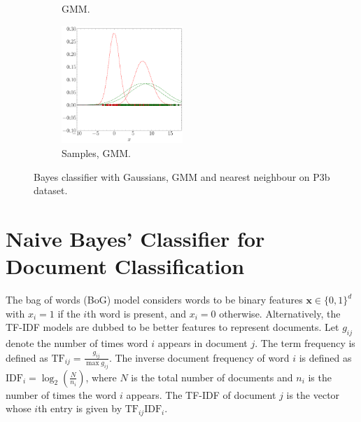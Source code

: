 \documentclass[12pt, a4 paper]{article}
\newcommand{\bx}{\mathbf{x}}
\begin{document}
\begin{figure}[!htbp]
\begin{subfigure}[!htbp]{0.24\textwidth}
       \caption{GMM.}
       \label{fig:GMM_P3b}
    \end{subfigure}
\quad \quad
    \begin{subfigure}[!htbp]{0.24\textwidth}
       \centering
       \includegraphics[width=1.8in]{../results/ex3/samples_GMM_EM_dataset_P3b_size_199.pdf}
       \caption{Samples, GMM.}
       \label{fig:GMM_DF_P3b}
    \end{subfigure}
\caption{Bayes classifier with Gaussians, GMM and nearest neighbour on P3b dataset.}
\label{fig:ex3P3b}
\end{figure}



\section{Naive Bayes' Classifier for Document Classification}
\label{sec:docClassification}
The bag of words (BoG) model considers words to be binary features $\bx \in \{0,1\}^{d}$ with $x_{i} = 1$ if the $i$th word is present, and $x_{i} = 0$ otherwise. Alternatively, the TF-IDF models are dubbed to be better features to represent documents. Let $g_{ij}$ denote the number of times word $i$ appears in document $j$. The term frequency is defined as $\mathrm{TF}_{ij} = \frac{g_{ij}}{\max g_{ij}}$. The inverse document frequency of word $i$ is defined as $\mathrm{IDF}_{i} = \log_{2} \left( \frac{N}{n_{i}} \right)$, where $N$ is the total number of documents and $n_{i}$ is the number of times the word $i$ appears. The TF-IDF of document $j$ is the vector whose $i$th entry is given by $\mathrm{TF}_{ij} \mathrm{IDF}_{i}$. \\
\end{document}
